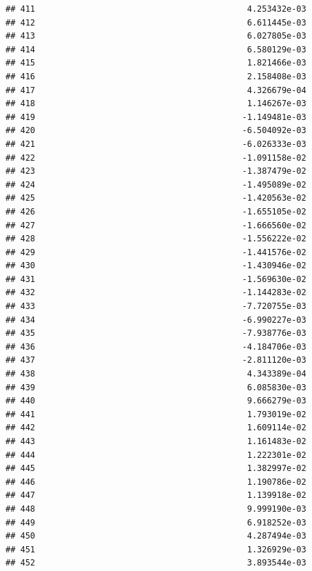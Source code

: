 \documentclass[
]{article}
\begin{document}
\begin{verbatim}
## 411                                           4.253432e-03
## 412                                           6.611445e-03
## 413                                           6.027805e-03
## 414                                           6.580129e-03
## 415                                           1.821466e-03
## 416                                           2.158408e-03
## 417                                           4.326679e-04
## 418                                           1.146267e-03
## 419                                          -1.149481e-03
## 420                                          -6.504092e-03
## 421                                          -6.026333e-03
## 422                                          -1.091158e-02
## 423                                          -1.387479e-02
## 424                                          -1.495089e-02
## 425                                          -1.420563e-02
## 426                                          -1.655105e-02
## 427                                          -1.666560e-02
## 428                                          -1.556222e-02
## 429                                          -1.441576e-02
## 430                                          -1.430946e-02
## 431                                          -1.569630e-02
## 432                                          -1.144283e-02
## 433                                          -7.720755e-03
## 434                                          -6.990227e-03
## 435                                          -7.938776e-03
## 436                                          -4.184706e-03
## 437                                          -2.811120e-03
## 438                                           4.343389e-04
## 439                                           6.085830e-03
## 440                                           9.666279e-03
## 441                                           1.793019e-02
## 442                                           1.609114e-02
## 443                                           1.161483e-02
## 444                                           1.222301e-02
## 445                                           1.382997e-02
## 446                                           1.190786e-02
## 447                                           1.139918e-02
## 448                                           9.999190e-03
## 449                                           6.918252e-03
## 450                                           4.287494e-03
## 451                                           1.326929e-03
## 452                                           3.893544e-03

\end{verbatim}
\end{document}
